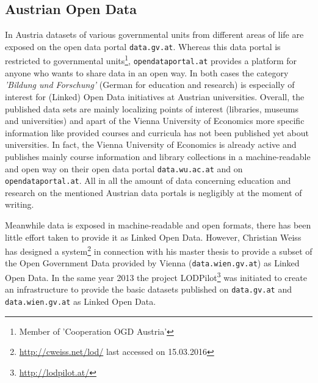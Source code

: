\documentclass{article}
\begin{document}
\subsection{Austrian Open Data}
\label{related-work:austrian-open-data}
In Austria datasets of various governmental units from different areas of life are exposed on the open data portal \texttt{data.gv.at}. Whereas this data portal is restricted to governmental units\footnote{Member of 'Cooperation OGD Austria'}, \texttt{opendataportal.at} provides a platform for anyone who wants to share data in an open way. In both cases the category \textit{'Bildung und Forschung'} (German for education and research) is especially of interest for (Linked) Open Data initiatives at Austrian universities. Overall, the published data sets are mainly localizing points of interest (libraries, museums and universities) and apart of the Vienna University of Economics more specific information like provided courses and curricula has not been published yet about universities. In fact, the Vienna University of Economics is already active and publishes mainly course information and library collections in a machine-readable and open way on their open data portal \texttt{data.wu.ac.at} and on \texttt{opendataportal.at}. All in all the amount of data concerning education and research on the mentioned Austrian data portals is negligibly at the moment of writing.

Meanwhile data is exposed in machine-readable and open formats, there has been little effort taken to provide it as Linked Open Data. However, Christian Weiss has designed a system\footnote{\url{http://cweiss.net/lod/} last accessed on 15.03.2016} in connection with his master thesis\cite{weiss_transferring_2013} to provide a subset of the Open Government Data provided by Vienna (\texttt{data.wien.gv.at}) as Linked Open Data. In the same year 2013 the project LODPilot\footnote{\url{http://lodpilot.at/}} was initiated to create an infrastructure to provide the basic datasets published on \texttt{data.gv.at} and \texttt{data.wien.gv.at} as Linked Open Data.
\end{document}
